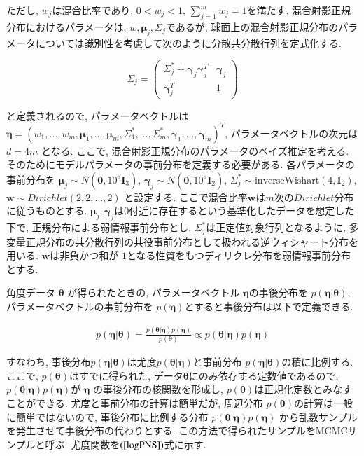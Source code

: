 \documentclass[a4j,11pt]{jarticle}
\begin{document}
\vspace{-1zh}
\noindent
ただし, $w_j$は混合比率であり, $0 < w_j < 1$, $\sum^m_{j=1} w_j = 1$を満たす. 混合射影正規分布におけるパラメータは, $w, \bm \mu_j, \Sigma_j$であるが, 球面上の混合射影正規分布のパラメータについては識別性を考慮して次のように分散共分散行列を定式化する. 

\vspace{-1zh}
\[
 \Sigma_j = \left(
    \begin{array}{cc}
      \Sigma^*_j + \bm \gamma_j \bm \gamma_j^T & \bm \gamma_j \\
      \bm \gamma_j^T & 1
    \end{array}
  \right)
\]

\vspace{-0.5zh}
\noindent
と定義されるので, パラメータベクトルは$\bm \eta = (w_1, \dots, w_m, \bm \mu_1, \dots, \bm \mu_m, \Sigma^*_1, \dots, \Sigma^*_m, \bm \gamma_1, \dots, \bm \gamma_m)^T$, パラメータベクトルの次元は $d = 4m$ となる. ここで, 混合射影正規分布のパラメータのベイズ推定を考える. そのためにモデルパラメータの事前分布を定義する必要がある. 各パラメータの事前分布を $\bm \mu_j \sim N(\bm 0, 10^5 \bm I_3)$, $\bm \gamma_j \sim  N(\bm 0, 10^5 \bm I_2)$, $\Sigma^*_j \sim \mathrm{inverse Wishart}(4,\bm I_2)$, $\bm w \sim Dirichlet(2,2, \dots, 2)$ と設定する. ここで混合比率$\bm w$は$m$次の$Dirichlet$分布に従うものとする. $\bm \mu_j, \bm \gamma_j$は$0$付近に存在するという基準化したデータを想定した下で, 正規分布による弱情報事前分布とし, $\Sigma^*_j$は正定値対象行列となるように, 多変量正規分布の共分散行列の共役事前分布として扱われる逆ウィシャート分布を用いる. $\bm w$は非負かつ和が $1$となる性質をもつディリクレ分布を弱情報事前分布とする.

角度データ $\bm \theta$ が得られたときの, パラメータベクトル $\bm \eta$の事後分布を $p(\bm \eta| \bm \theta)$, パラメータベクトルの事前分布を $p(\bm \eta)$とすると事後分布は以下で定義できる. 

\vspace{-1zh}
\begin{eqnarray*}
p(\bm \eta | \bm \theta) = \frac{p(\bm \theta | \bm \eta) p(\bm \eta)}{p(\bm \theta)} \propto p(\bm \theta | \bm \eta) p(\bm \eta)
\end{eqnarray*}

\vspace{-0.5zh}
\noindent
すなわち, 事後分布$p(\bm \eta | \bm \theta)$は尤度$p(\bm \theta | \bm \eta)$と事前分布 $p(\bm \eta| \bm \theta)$の積に比例する. ここで, $p(\bm \theta)$はすでに得られた, データ$\bm \theta$にのみ依存する定数値であるので, $p(\bm \theta | \bm \eta) p(\bm \eta)$が $\bm \eta$  の事後分布の核関数を形成し, $p(\bm \theta)$は正規化定数とみなすことができる. 尤度と事前分布の計算は簡単だが, 周辺分布 $p(\bm \theta)$の計算は一般に簡単ではないので, 事後分布に比例する分布 $p(\bm \theta | \bm \eta) p(\bm \eta)$ から乱数サンプルを発生させて事後分布の代わりとする. この方法で得られたサンプルをMCMCサンプルと呼ぶ. 尤度関数を$(\ref{logPNS})$式に示す. 
\end{document}
